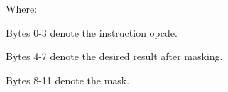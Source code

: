 Where:

Bytes 0-3 denote the instruction opcde.

Bytes 4-7 denote the desired result after masking.

Bytes 8-11 denote the mask.

